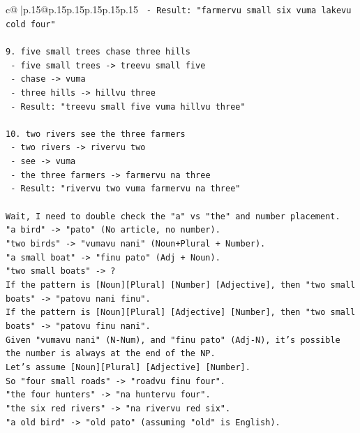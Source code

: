 \documentclass{article}
\begin{document}
{\begin{supertabular}{c@{$\;$}|p{.15\linewidth}@{}p{.15\linewidth}p{.15\linewidth}p{.15\linewidth}p{.15\linewidth}p{.15\linewidth}}
{{{\texttt{   {-} Result: "farmervu small six vuma lakevu cold four"} \\
\\ 
\texttt{9. five small trees chase three hills} \\
\texttt{   {-} five small trees {-}> treevu small five} \\
\texttt{   {-} chase {-}> vuma} \\
\texttt{   {-} three hills {-}> hillvu three} \\
\texttt{   {-} Result: "treevu small five vuma hillvu three"} \\
\\ 
\texttt{10. two rivers see the three farmers} \\
\texttt{    {-} two rivers {-}> rivervu two} \\
\texttt{    {-} see {-}> vuma} \\
\texttt{    {-} the three farmers {-}> farmervu na three} \\
\texttt{    {-} Result: "rivervu two vuma farmervu na three"} \\
\\ 
\texttt{Wait, I need to double check the "a" vs "the" and number placement.} \\
\texttt{"a bird" {-}> "pato" (No article, no number).} \\
\texttt{"two birds" {-}> "vumavu nani" (Noun+Plural + Number).} \\
\texttt{"a small boat" {-}> "finu pato" (Adj + Noun).} \\
\texttt{"two small boats" {-}> ?} \\
\texttt{If the pattern is {[}Noun{]}{[}Plural{]} {[}Number{]} {[}Adjective{]}, then "two small boats" {-}> "patovu nani finu".} \\
\texttt{If the pattern is {[}Noun{]}{[}Plural{]} {[}Adjective{]} {[}Number{]}, then "two small boats" {-}> "patovu finu nani".} \\
\texttt{Given "vumavu nani" (N{-}Num), and "finu pato" (Adj{-}N), it's possible the number is always at the end of the NP.} \\
\texttt{Let's assume {[}Noun{]}{[}Plural{]} {[}Adjective{]} {[}Number{]}.} \\
\texttt{So "four small roads" {-}> "roadvu finu four".} \\
\texttt{"the four hunters" {-}> "na huntervu four".} \\
\texttt{"the six red rivers" {-}> "na rivervu red six".} \\
\texttt{"a old bird" {-}> "old pato" (assuming "old" is English).} \\
}}}
\end{supertabular}}
\end{document}
